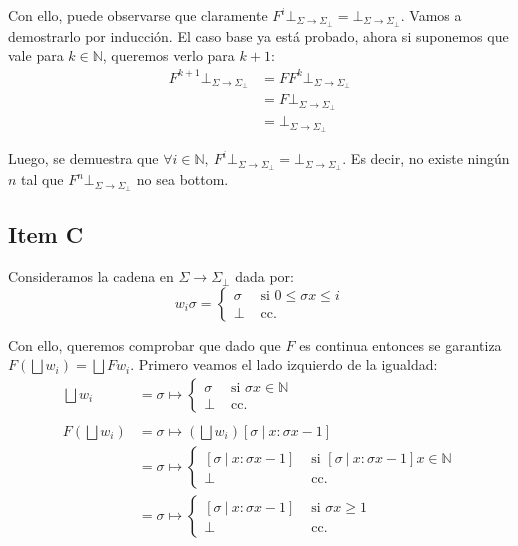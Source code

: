 \documentclass{article}
\newcommand{\N}{\mathbb{N}}
\newcommand{\supr}{\bigsqcup\limits}
\newcommand{\cdom}{\Sigma \to \Sigma_\bot}
\newcommand{\cfbot}{\bot_{\cdom}}
\begin{document}
Con ello, puede observarse que claramente $F^i \cfbot = \cfbot$.
Vamos a demostrarlo por inducción.
El caso base ya está probado, ahora si suponemos que vale para $k \in \N$, queremos verlo para $k+1$:
\begin{equation*}
  \begin{aligned}
    F^{k+1} \cfbot &= F F^k \cfbot \\ 
                   &= F \cfbot \\ 
                   &= \cfbot
  \end{aligned}
\end{equation*}

Luego, se demuestra que $\forall i \in \N,\ F^i \cfbot = \cfbot$.
Es decir, no existe ningún $n$ tal que $F^n \cfbot$ no sea bottom.

\subsection*{Item C}
Consideramos la cadena en $\cdom$ dada por:
\begin{equation*}
  w_i \sigma = \begin{cases}
    \sigma &\text{ si }0\leq \sigma x \leq i \\ 
    \bot & \text{ cc. }
  \end{cases}
\end{equation*}

Con ello, queremos comprobar que dado que $F$ es continua entonces se garantiza $F(\supr w_i) = \supr F w_i$.
Primero veamos el lado izquierdo de la igualdad:
\begin{equation*}
    \begin{aligned}
      \supr w_i &= \sigma \mapsto \begin{cases}
        \sigma &\text{ si }\sigma x \in \N \\ 
        \bot &\text{ cc. }
      \end{cases} \\ 
      \\ 
        F\left(\supr w_i\right) &= \sigma \mapsto \left(\supr w_i\right)[\sigma\ |\ x : \sigma x - 1] \\ 
                     &= \sigma \mapsto \begin{cases}
                       [\sigma\ |\ x : \sigma x - 1] &\text{ si }[\sigma\ |\ x : \sigma x - 1] x \in \N \\ 
                       \bot &\text{ cc. }
                     \end{cases} \\ 
                     &= \sigma \mapsto \begin{cases}
                       [\sigma\ |\ x : \sigma x - 1] &\text{ si }\sigma x \geq 1 \\ 
                       \bot &\text{ cc. }
                     \end{cases}
    \end{aligned}
\end{equation*}
\end{document}
